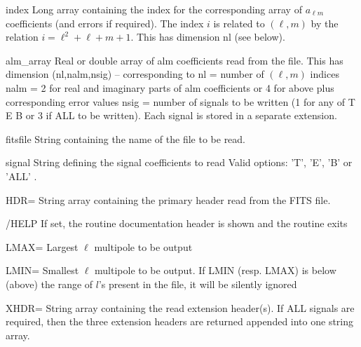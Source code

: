 \begin{qualifiers}
  \begin{qulist}{} %
    \item[index]  Long array containing the index for the corresponding
                 array of $a_{\ell m}$ coefficients (and errors if required). The
                 index ${i}$ is related to $(\ell,m)$ by the relation \hfill\newline
                 $i = \ell^2 + \ell + m + 1.$ \newline This has dimension
    nl (see below).
    \item[alm\_array]  Real or double array of alm coefficients read from the
      file. This has dimension (nl,nalm,nsig) -- corresponding to\hfill\newline
      nl   = number of $(\ell,m)$ indices \hfill\newline
      nalm = 2 for real and imaginary parts of alm coefficients or
             4 for above plus corresponding error values \hfill\newline
      nsig = number of signals to be written (1 for any of T E B
             or 3 if ALL to be written). Each signal is stored
             in a separate extension.
    \item[fitsfile] String containing the name of the file to be
      read.
    \item[signal] String defining the signal coefficients to read
                  Valid options: 'T', 'E', 'B' or 'ALL' \hfill\newline
	.  
  \end{qulist}
\end{qualifiers}

\begin{keywords}
  \begin{kwlist}{} %
    \item[HDR=] String array containing the primary header read from the FITS
      file. 
    \item[/HELP] If set, the routine documentation header is shown and the routine exits	
    \item[LMAX=] Largest $\ell$ multipole  to be output
    \item[LMIN=] Smallest $\ell$ multipole to be output. If LMIN (resp. LMAX) is below (above) the range of $l$'s present in the file,
              it will be silently ignored
    \item[XHDR=] String array containing the read extension header(s). If
                  ALL signals are required, then the three extension 
                  headers are returned appended into one string array.
  \end{kwlist}
\end{keywords}  

